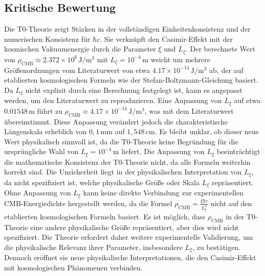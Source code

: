 \documentclass{article}
\begin{document}
	\subsection{Kritische Bewertung}
	Die T0-Theorie zeigt Stärken in der vollständigen Einheitenkonsistenz und der numerischen Konsistenz für $\hbar c$. Sie verknüpft den Casimir-Effekt mit der kosmischen Vakuumenergie durch die Parameter $\xi$ und $L_\xi$. Der berechnete Wert von $\rho_{\text{CMB}} \approx 2.372 \times 10^6 \, \text{J}/\text{m}^3$ mit $L_\xi = 10^{-4} \, \text{m}$ weicht um mehrere Größenordnungen vom Literaturwert von etwa $4.17 \times 10^{-14} \, \text{J}/\text{m}^3$ ab, der auf etablierten kosmologischen Formeln wie der Stefan-Boltzmann-Gleichung basiert. Da $L_\xi$ nicht explizit durch eine Berechnung festgelegt ist, kann es angepasst werden, um den Literaturwert zu reproduzieren. Eine Anpassung von $L_\xi$ auf etwa $0.01548 \, \text{m}$ führt zu $\rho_{\text{CMB}} \approx 4.17 \times 10^{-14} \, \text{J}/\text{m}^3$, was mit dem Literaturwert übereinstimmt. Diese Anpassung verändert jedoch die charakteristische Längenskala erheblich von $0,1 \, \text{mm}$ auf $1,548 \, \text{cm}$. Es bleibt unklar, ob dieser neue Wert physikalisch sinnvoll ist, da die T0-Theorie keine Begründung für die ursprüngliche Wahl von $L_\xi = 10^{-4} \, \text{m}$ liefert. Die Anpassung von $L_\xi$ beeinträchtigt die mathematische Konsistenz der T0-Theorie nicht, da alle Formeln weiterhin korrekt sind. Die Unsicherheit liegt in der physikalischen Interpretation von $L_\xi$, da nicht spezifiziert ist, welche physikalische Größe oder Skala $L_\xi$ repräsentiert. Ohne Anpassung von $L_\xi$ kann keine direkte Verbindung zur experimentellen CMB-Energiedichte hergestellt werden, da die Formel $\rho_{\text{CMB}} = \frac{\xi \hbar c}{L_\xi^4}$ nicht auf den etablierten kosmologischen Formeln basiert. Es ist möglich, dass $\rho_{\text{CMB}}$ in der T0-Theorie eine andere physikalische Größe repräsentiert, aber dies wird nicht spezifiziert. Die Theorie erfordert daher weitere experimentelle Validierung, um die physikalische Relevanz ihrer Parameter, insbesondere $L_\xi$, zu bestätigen. Dennoch eröffnet sie neue physikalische Interpretationen, die den Casimir-Effekt mit kosmologischen Phänomenen verbinden.
	
\end{document}

